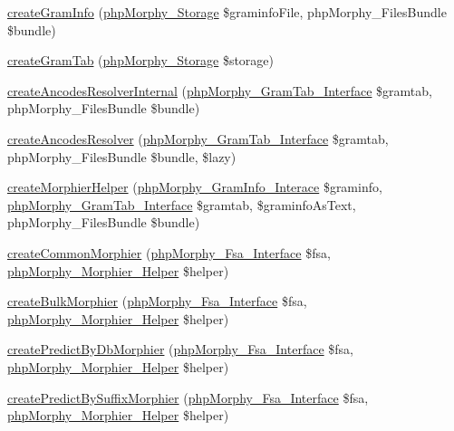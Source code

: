 \begin{DoxyCompactItemize}
\item 
\hyperlink{classphpMorphy_a9150b2ee5315b69b001228ed1c62a3d8}{createGramInfo} (\hyperlink{classphpMorphy__Storage}{phpMorphy\_\-Storage} \$graminfoFile, phpMorphy\_\-FilesBundle \$bundle)
\item 
\hyperlink{classphpMorphy_ab0acf5da86a1c81a1e6e9e66b352994d}{createGramTab} (\hyperlink{classphpMorphy__Storage}{phpMorphy\_\-Storage} \$storage)
\item 
\hyperlink{classphpMorphy_a683ab506c0fd37429b813fd3b7b5eb4a}{createAncodesResolverInternal} (\hyperlink{interfacephpMorphy__GramTab__Interface}{phpMorphy\_\-GramTab\_\-Interface} \$gramtab, phpMorphy\_\-FilesBundle \$bundle)
\item 
\hyperlink{classphpMorphy_ad63d33364788bcd3bedaa3a2ae17052f}{createAncodesResolver} (\hyperlink{interfacephpMorphy__GramTab__Interface}{phpMorphy\_\-GramTab\_\-Interface} \$gramtab, phpMorphy\_\-FilesBundle \$bundle, \$lazy)
\item 
\hyperlink{classphpMorphy_ae70d97af2dd18915079bc5d03e3a22e4}{createMorphierHelper} (\hyperlink{interfacephpMorphy__GramInfo__Interace}{phpMorphy\_\-GramInfo\_\-Interace} \$graminfo, \hyperlink{interfacephpMorphy__GramTab__Interface}{phpMorphy\_\-GramTab\_\-Interface} \$gramtab, \$graminfoAsText, phpMorphy\_\-FilesBundle \$bundle)
\item 
\hyperlink{classphpMorphy_a265fb0837cb5d0e66c4b6061c499fd36}{createCommonMorphier} (\hyperlink{interfacephpMorphy__Fsa__Interface}{phpMorphy\_\-Fsa\_\-Interface} \$fsa, \hyperlink{classphpMorphy__Morphier__Helper}{phpMorphy\_\-Morphier\_\-Helper} \$helper)
\item 
\hyperlink{classphpMorphy_aa12a75d7145a626cfb6686b5831be174}{createBulkMorphier} (\hyperlink{interfacephpMorphy__Fsa__Interface}{phpMorphy\_\-Fsa\_\-Interface} \$fsa, \hyperlink{classphpMorphy__Morphier__Helper}{phpMorphy\_\-Morphier\_\-Helper} \$helper)
\item 
\hyperlink{classphpMorphy_af14b15fccc96d276854f469eafecebf1}{createPredictByDbMorphier} (\hyperlink{interfacephpMorphy__Fsa__Interface}{phpMorphy\_\-Fsa\_\-Interface} \$fsa, \hyperlink{classphpMorphy__Morphier__Helper}{phpMorphy\_\-Morphier\_\-Helper} \$helper)
\item 
\hyperlink{classphpMorphy_add68f1a07119588887165ae221a59e06}{createPredictBySuffixMorphier} (\hyperlink{interfacephpMorphy__Fsa__Interface}{phpMorphy\_\-Fsa\_\-Interface} \$fsa, \hyperlink{classphpMorphy__Morphier__Helper}{phpMorphy\_\-Morphier\_\-Helper} \$helper)
\end{DoxyCompactItemize}

